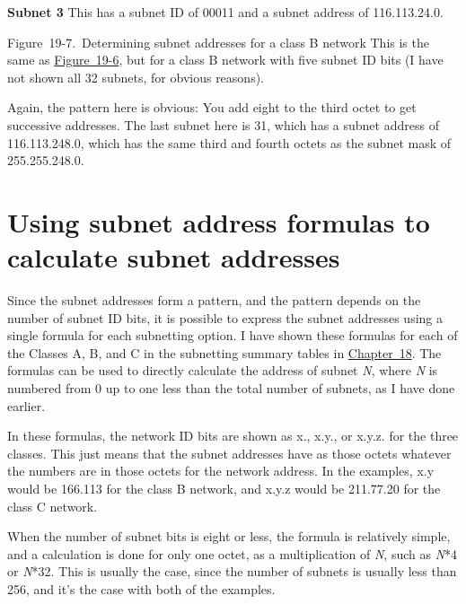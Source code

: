 {\textbf{Subnet 3}} This has a subnet ID of 00011 and a subnet address
of 116.113.24.0.

\protect\hypertarget{ch19s04.htmlux5cux23determining_subnet_addresses_for_a-id001}{}{}

\protect\hypertarget{ch19s04.htmlux5cux23I_mediaobject5_d1e21014}{}{}

Figure~19-7.~Determining subnet addresses for a class B network This is
the same as
\protect\hyperlink{ch19s04.htmlux5cux23determining_subnet_addresses_for_a_class}{Figure~19-6},
but for a class B network with five subnet ID bits (I have not shown all
32 subnets, for obvious reasons).

\protect\hypertarget{ch19s04.htmlux5cux23idx-CHP-19-0751}{}{}Again, the
pattern here is obvious: You add eight to the third octet to get
successive addresses. The last subnet here is 31, which has a subnet
address of 116.113.248.0, which has the same third and fourth octets as
the subnet mask of 255.255.248.0.




\section{Using subnet address formulas to calculate subnet addresses}

\protect\hypertarget{ch19s04.htmlux5cux23idx-CHP-19-0752}{}{}Since the
subnet addresses form a pattern, and the pattern depends on the number
of subnet ID bits, it is possible to express the subnet addresses using
a single formula for each subnetting option. I have shown these formulas
for each of the Classes A, B, and C in the subnetting summary tables in
\protect\hyperlink{ch18.html}{Chapter~18}. The formulas can be used to
directly calculate the address of subnet {\emph{N}}, where {\emph{N}} is
numbered from 0 up to one less than the total number of subnets, as I
have done earlier.

In these formulas, the network ID bits are shown as x., x.y., or x.y.z.
for the three classes. This just means that the subnet addresses have as
those octets whatever the numbers are in those octets for the network
address. In the examples, x.y would be 166.113 for the class B network,
and x.y.z would be 211.77.20 for the class C network.

When the number of subnet bits is eight or less, the formula is
relatively simple, and a calculation is done for only one octet, as a
multiplication of {\emph{N}}, such as {\emph{N}}*4 or {\emph{N}}*32.
This is usually the case, since the number of subnets is usually less
than 256, and it's the case with both of the examples.

